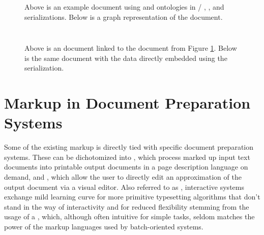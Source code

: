 \documentclass{book}
\begin{document}
\begin{figure}
  \inputminted{xml}{examples/02/john.rd}
  \inputminted{text}{examples/02/john.nt}
  \inputminted{text}{examples/02/john.ttl}
  \caption{Above is an example  document using  and
     ontologies in /%
    , , and %
     serializations. Below is a graph representation of the
    document.}\label{fig:rdf-doc}\bigskip
  
\end{figure}

\begin{figure}[t!]
  \inputminted{html}{examples/02/john.html.linked-rdf}
  \caption{Above is an  document linked to the 
    document from Figure \ref{fig:rdf-doc}. Below is the same 
    document with the  data directly embedded using the
     serialization.}\bigskip
  \inputminted{html}{examples/02/john.html.rdfa}
\end{figure}

        
\section{Markup in Document Preparation Systems}
Some of the existing markup is directly tied with specific document preparation
systems. These can be dichotomized into 
, which process marked up input
text documents into printable output documents in a page description language on
demand, and  , which allow the user to directly edit an approximation of
the output document via a visual editor. Also referred to as ,
interactive systems exchange mild learning curve for more primitive typesetting
algorithms that don't stand in the way of interactivity and for reduced
flexibility stemming from the usage of a , which, although often
intuitive for simple tasks, seldom matches the power of the markup languages
used by batch-oriented systems.
\end{document}
